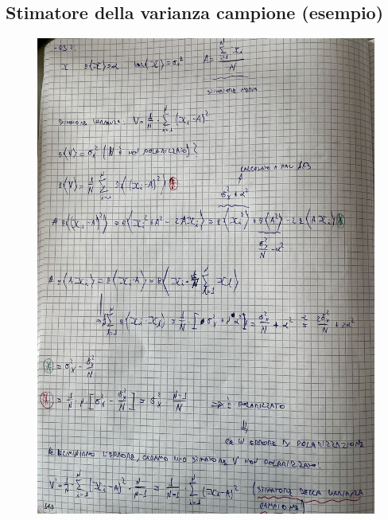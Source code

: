 \documentclass{article}
\begin{document}
\subsection{Stimatore della varianza campione (esempio)}
\begin{figure}[ht]
\centering
\includegraphics[scale=0.16]{ese/54.jpeg}
\end{figure}
\end{document}
